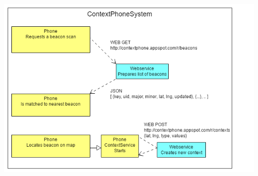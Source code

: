 \documentclass{sigchi}
\begin{document}


\onecolumn
\begin{appendix}
\includegraphics[scale=0.7]{images/diagram}
\end{appendix}
\end{document}
